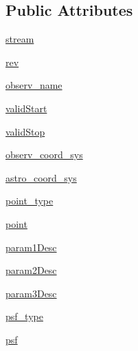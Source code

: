 \subsection*{Public Attributes}
\begin{DoxyCompactItemize}
\item 
\hyperlink{classamonpy_1_1dbase_1_1db__classes_1_1_event_stream_config_a626d7977f5d3f63c3fbfb23d6b9716b3}{stream}
\item 
\hyperlink{classamonpy_1_1dbase_1_1db__classes_1_1_event_stream_config_af5e27bac4e9b5e18760ce85144f77bd4}{rev}
\item 
\hyperlink{classamonpy_1_1dbase_1_1db__classes_1_1_event_stream_config_a1736bfbecd4e57692307b26b11e85daf}{observ\-\_\-name}
\item 
\hyperlink{classamonpy_1_1dbase_1_1db__classes_1_1_event_stream_config_a92a9f0427f9d329992a04b077c311220}{valid\-Start}
\item 
\hyperlink{classamonpy_1_1dbase_1_1db__classes_1_1_event_stream_config_a55ef53af27e48c213db7b409c5459237}{valid\-Stop}
\item 
\hyperlink{classamonpy_1_1dbase_1_1db__classes_1_1_event_stream_config_ad7efccac3ae9b077bcc4d89595d82c08}{observ\-\_\-coord\-\_\-sys}
\item 
\hyperlink{classamonpy_1_1dbase_1_1db__classes_1_1_event_stream_config_aa3473b12a560dcab050cfe14e1edb203}{astro\-\_\-coord\-\_\-sys}
\item 
\hyperlink{classamonpy_1_1dbase_1_1db__classes_1_1_event_stream_config_a86e9966cac57a6aeddb4b6172ec1acfc}{point\-\_\-type}
\item 
\hyperlink{classamonpy_1_1dbase_1_1db__classes_1_1_event_stream_config_a138f290e26aa6b56d96f8b6bd9987b8f}{point}
\item 
\hyperlink{classamonpy_1_1dbase_1_1db__classes_1_1_event_stream_config_a2cc2e81b812c4e80b5d87779e1a320fe}{param1\-Desc}
\item 
\hyperlink{classamonpy_1_1dbase_1_1db__classes_1_1_event_stream_config_a1ac9462fd28120622b692b6db54521e0}{param2\-Desc}
\item 
\hyperlink{classamonpy_1_1dbase_1_1db__classes_1_1_event_stream_config_ac41f0f97661c293dce64bc89c8b9eade}{param3\-Desc}
\item 
\hyperlink{classamonpy_1_1dbase_1_1db__classes_1_1_event_stream_config_a9d8b36ab1042618f6e399a8f66b42118}{psf\-\_\-type}
\item 
\hyperlink{classamonpy_1_1dbase_1_1db__classes_1_1_event_stream_config_a12170d85350140f5fda128878d91277e}{psf}

\end{DoxyCompactItemize}
